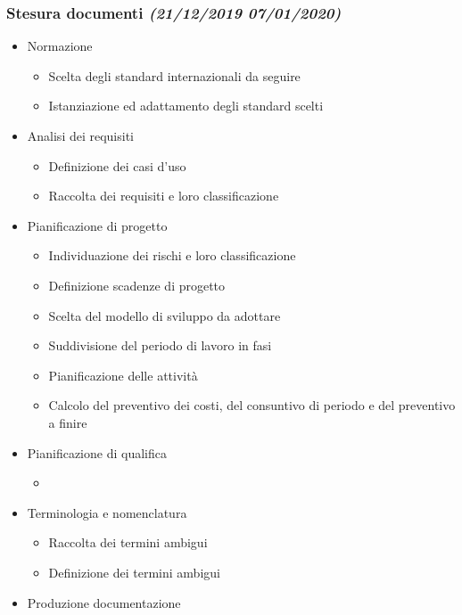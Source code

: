 \documentclass[../piano-di-progetto.tex]{subfiles}
\begin{document}
\subsubsection[Analisi e pianificazione]{Stesura documenti {\normalsize\normalfont\itshape(21/12/2019  07/01/2020)}}%
\label{subs:analisi_e_pianificazione}
\begin{itemize}
  \item Normazione
  \begin{itemize}
    \item Scelta degli standard internazionali da seguire
    \item Istanziazione ed adattamento degli standard scelti
  \end{itemize}
  \item Analisi dei requisiti
  \begin{itemize}
    \item Definizione dei casi d'uso
    \item Raccolta dei requisiti e loro classificazione
  \end{itemize}
  \item Pianificazione di progetto
  \begin{itemize}
    \item Individuazione dei rischi e loro classificazione
    \item Definizione scadenze di progetto
    \item Scelta del modello di sviluppo da adottare
    \item Suddivisione del periodo di lavoro in fasi
    \item Pianificazione delle attività
    \item Calcolo del preventivo dei costi, del consuntivo di periodo e del preventivo a finire
  \end{itemize}
  \item Pianificazione di qualifica
  \begin{itemize}
    \item {}
  \end{itemize}
  \item Terminologia e nomenclatura
  \begin{itemize}
    \item Raccolta dei termini ambigui
    \item Definizione dei termini ambigui
  \end{itemize}
  \item Produzione documentazione
  \begin{itemize}

\end{itemize}
\end{itemize}
\end{document}

